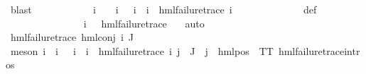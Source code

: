 \begin{isabellebody}
\ blast\isanewline
\ \ \ \ \ \ \ \ \ \ \isamarkupfalse%
\ {\isachardoublequoteopen}{\isacharparenleft}{\kern0pt}{\isasymexists}i\ {\isasymin}\ {\isasymPsi}\ {\isacharbackquote}{\kern0pt}\ {\isacharbraceleft}{\kern0pt}i{\isacharunderscore}{\kern0pt}{\isasymphi}{\isacharbraceright}{\kern0pt}{\isachardot}{\kern0pt}\ {\isasymPsi}\ {\isacharbackquote}{\kern0pt}\ {\isacharbraceleft}{\kern0pt}i{\isacharunderscore}{\kern0pt}{\isasymphi}{\isacharbraceright}{\kern0pt}\ {\isacharequal}{\kern0pt}\ {\isacharbraceleft}{\kern0pt}i{\isacharbraceright}{\kern0pt}\ {\isasymand}\ hml{\isacharunderscore}{\kern0pt}failure{\isacharunderscore}{\kern0pt}trace\ i{\isacharparenright}{\kern0pt}{\isachardoublequoteclose}\isanewline
\ \ \ \ \ \ \ \ \ \ \ \ \isamarkupfalse%
\ {\isasymPsi}{\isacharunderscore}{\kern0pt}def\isanewline
\ \ \ \ \ \ \ \ \ \ \ \ \isamarkupfalse%
\ {\isacartoucheopen}{\isasymPsi}\ {\isacharbackquote}{\kern0pt}\ {\isacharbraceleft}{\kern0pt}i{\isacharunderscore}{\kern0pt}{\isasymphi}{\isacharbraceright}{\kern0pt}\ {\isacharequal}{\kern0pt}\ {\isacharbraceleft}{\kern0pt}{\isasympsi}{\isacharbraceright}{\kern0pt}{\isacartoucheclose}\ {\isacartoucheopen}hml{\isacharunderscore}{\kern0pt}failure{\isacharunderscore}{\kern0pt}trace\ {\isasympsi}{\isacartoucheclose}\ \isamarkupfalse%
\ auto\isanewline
\ \ \ \ \ \ \ \ \ \ \isamarkupfalse%
\ {\isachardoublequoteopen}hml{\isacharunderscore}{\kern0pt}failure{\isacharunderscore}{\kern0pt}trace\ {\isacharparenleft}{\kern0pt}hml{\isacharunderscore}{\kern0pt}conj\ {\isacharbraceleft}{\kern0pt}i{\isacharunderscore}{\kern0pt}{\isasymphi}{\isacharbraceright}{\kern0pt}\ J\ {\isasymPsi}{\isacharparenright}{\kern0pt}{\isachardoublequoteclose}\isanewline
\ \ \ \ \ \ \ \ \ \ \ \ \isamarkupfalse%
\ {\isacharparenleft}{\kern0pt}meson\ {\isacartoucheopen}{\isasymexists}i{\isasymin}{\isasymPsi}\ {\isacharbackquote}{\kern0pt}\ {\isacharbraceleft}{\kern0pt}i{\isacharunderscore}{\kern0pt}{\isasymphi}{\isacharbraceright}{\kern0pt}{\isachardot}{\kern0pt}\ {\isasymPsi}\ {\isacharbackquote}{\kern0pt}\ {\isacharbraceleft}{\kern0pt}i{\isacharunderscore}{\kern0pt}{\isasymphi}{\isacharbraceright}{\kern0pt}\ {\isacharequal}{\kern0pt}\ {\isacharbraceleft}{\kern0pt}i{\isacharbraceright}{\kern0pt}\ {\isasymand}\ hml{\isacharunderscore}{\kern0pt}failure{\isacharunderscore}{\kern0pt}trace\ i{\isacartoucheclose}\ {\isacartoucheopen}{\isasymforall}j{\isasymin}{\isasymPsi}\ {\isacharbackquote}{\kern0pt}\ J{\isachardot}{\kern0pt}\ {\isasymexists}{\isasymalpha}{\isachardot}{\kern0pt}\ j\ {\isacharequal}{\kern0pt}\ hml{\isacharunderscore}{\kern0pt}pos\ {\isasymalpha}\ TT{\isacartoucheclose}\ hml{\isacharunderscore}{\kern0pt}failure{\isacharunderscore}{\kern0pt}trace{\isachardot}{\kern0pt}intros{\isacharparenleft}{\kern0pt}{}{\isacharparenright}{\kern0pt}{\isacharparenright}{\kern0pt}\isanewline

\end{isabellebody}
